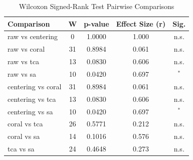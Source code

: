 \begin{table}[htbp]
\centering
\caption{Wilcoxon Signed-Rank Test Pairwise Comparisons}
\label{tab:wilcoxon}
\begin{tabular}{lcccc}
\toprule
Comparison & W & p-value & Effect Size (r) & Sig. \\
\midrule
raw vs centering & 0 & 1.0000 & 1.000 & n.s. \\
raw vs coral & 31 & 0.8984 & 0.061 & n.s. \\
raw vs tca & 13 & 0.0830 & 0.606 & n.s. \\
raw vs sa & 10 & 0.0420 & 0.697 & $^{*}$ \\
centering vs coral & 31 & 0.8984 & 0.061 & n.s. \\
centering vs tca & 13 & 0.0830 & 0.606 & n.s. \\
centering vs sa & 10 & 0.0420 & 0.697 & $^{*}$ \\
coral vs tca & 26 & 0.5771 & 0.212 & n.s. \\
coral vs sa & 14 & 0.1016 & 0.576 & n.s. \\
tca vs sa & 24 & 0.4648 & 0.273 & n.s. \\
\bottomrule
\end{tabular}
\end{table}